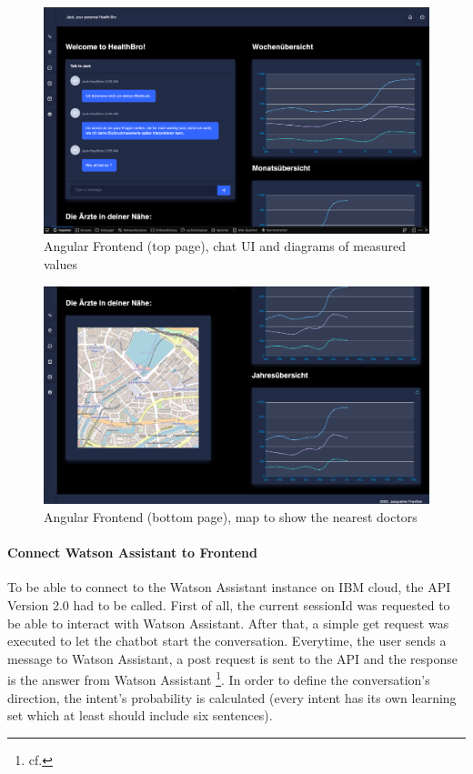 \begin{figure}[h]
	\centering
	\includegraphics[width=1\textwidth]{images/angular_01.png}
	\caption{Angular Frontend (top page), chat UI and diagrams of measured values}
	\label{angular_01}
\end{figure}
\begin{figure}[h]
	\centering
	\includegraphics[width=1\textwidth]{images/angular_02.png}
	\caption{Angular Frontend (bottom page), map to show the nearest doctors}
	\label{angular_02}
\end{figure}

\paragraph{Connect Watson Assistant to Frontend}

To be able to connect to the Watson Assistant instance on IBM cloud, the API Version 2.0 had to be called. First of all, the current sessionId was requested to be able to interact with Watson Assistant. After that, a simple get request was executed to let the chatbot start the conversation. Everytime, the user sends a message to Watson Assistant, a post request is sent to the API and the response is the answer from Watson Assistant \footnote{cf.\autocite{wa_api_v2}}. In order to define the conversation's direction, the intent's probability is calculated (every intent has its own learning set which at least should include six sentences).


